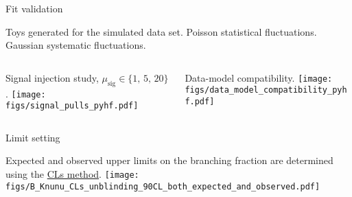 \begin{frame}[noframenumbering]{Fit validation}
\bi
\item Toys  generated  for  the simulated data set.
\bi
\itemii Poisson statistical fluctuations.
\itemii Gaussian systematic fluctuations.
\ei
\ei
\vspace{0.25cm}
\begin{columns}
\begin{column}{0.5\linewidth}
\bi
\item {\scriptsize Signal injection study, $\mu_{\mathrm{sig}}\in\{1,\,5,\,20\}$}.
\ei
\centering
\texttt{[image: figs/signal\_pulls\_pyhf.pdf]}
\end{column}
\begin{column}{0.5\linewidth}
\bi
\item {\scriptsize Data-model compatibility.}
\ei
\centering
\texttt{[image: figs/data\_model\_compatibility\_pyhf.pdf]}
\end{column}
\end{columns}
\end{frame}
\begin{frame}[noframenumbering]{Limit setting}
\bi
\item Expected and observed upper limits on the branching fraction are determined using the \href{https://iopscience.iop.org/article/10.1088/0954-3899/28/10/313}{\color{blue!40!gray} CLs method}.
\ei
\centering
\vspace{0.5cm}
\texttt{[image: figs/B\_Knunu\_CLs\_unblinding\_90CL\_both\_expected\_and\_observed.pdf]}
\end{frame}
